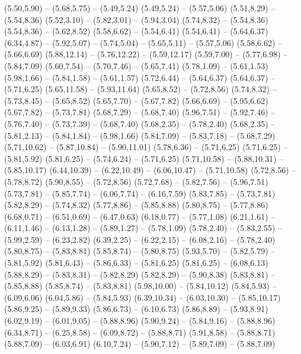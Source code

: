 {  (5.50,5.90) -- (5.68,5.75) -- (5.49,5.24)
  (5.49,5.24) -- (5.57,5.06)
  (5.51,8.29) -- (5.54,8.36)
  (5.52,3.10) -- (5.82,3.01) -- (5.94,3.04)
  (5.74,8.32) -- (5.54,8.36)
  (5.54,8.36) -- (5.62,8.52)
  (5.58,6.62) -- (5.54,6.41)
  (5.54,6.41) -- (5.64,6.37)
  (6.34,4.87) -- (5.92,5.07) -- (5.74,5.04) -- (5.65,5.11) -- (5.57,5.06)
  (5.58,6.62) -- (5.66,6.69)
  (5.88,12.14) -- (5.76,12.22) -- (5.59,12.17)
  (5.59,7.00) -- (5.77,6.98) -- (5.84,7.09)
  (5.60,7.54) -- (5.70,7.46) -- (5.65,7.41)
  (5.78,1.09) -- (5.61,1.53)
  (5.98,1.66) -- (5.84,1.58) -- (5.61,1.57)
  (5.72,6.44) -- (5.64,6.37)
  (5.64,6.37) -- (5.71,6.25)
  (5.65,11.58) -- (5.93,11.64)
  (5.65,8.52) -- (5.72,8.56)
  (5.74,8.32) -- (5.73,8.45) -- (5.65,8.52)
  (5.65,7.70) -- (5.67,7.82)
  (5.66,6.69) -- (5.95,6.62)
  (5.67,7.82) -- (5.73,7.81)
  (5.68,7.29) -- (5.68,7.40)
  (5.96,7.51) -- (5.92,7.46) -- (5.76,7.40) -- (5.73,7.39) -- (5.68,7.40)
  (5.68,2.35) -- (5.78,2.40)
  (5.68,2.35) -- (5.81,2.13) -- (5.84,1.84) -- (5.98,1.66)
  (5.84,7.09) -- (5.83,7.18) -- (5.68,7.29)
  (5.71,10.62) -- (5.87,10.84) -- (5.90,11.01)
  (5.78,6.36) -- (5.71,6.25)
  (5.71,6.25) -- (5.81,5.92)
  (5.81,6.25) -- (5.74,6.24) -- (5.71,6.25)
  (5.71,10.58) -- (5.88,10.31) -- (5.85,10.17)
  (6.44,10.39) -- (6.22,10.49) -- (6.06,10.47) -- (5.71,10.58)
  (5.72,8.56) -- (5.78,8.72)
  (5.90,8.55) -- (5.72,8.56)
  (5.72,7.68) -- (5.82,7.56) -- (5.96,7.51)
  (5.73,7.81) -- (5.85,7.74) -- (6.06,7.74) -- (6.16,7.59)
  (5.83,7.85) -- (5.73,7.81)
  (5.82,8.29) -- (5.74,8.32)
  (5.77,8.86) -- (5.85,8.88)
  (5.80,8.75) -- (5.77,8.86)
  (6.68,0.71) -- (6.51,0.69) -- (6.47,0.63)
  (6.18,0.77) -- (5.77,1.08)
  (6.21,1.61) -- (6.11,1.46) -- (6.13,1.28) -- (5.89,1.27) -- (5.78,1.09)
  (5.78,2.40) -- (5.83,2.55) -- (5.99,2.59) -- (6.23,2.82)
  (6.39,2.25) -- (6.22,2.15) -- (6.08,2.16) -- (5.78,2.40)
  (5.80,8.75) -- (5.83,8.81)
  (5.85,8.74) -- (5.80,8.75)
  (5.93,5.70) -- (5.82,5.79) -- (5.81,5.92)
  (5.81,6.43) -- (5.86,6.33) -- (5.81,6.25)
  (5.81,6.25) -- (6.08,6.13)
  (5.88,8.29) -- (5.83,8.31) -- (5.82,8.29)
  (5.82,8.29) -- (5.90,8.38)
  (5.83,8.81) -- (5.85,8.88)
  (5.85,8.74) -- (5.83,8.81)
  (5.98,10.00) -- (5.84,10.12)
  (5.84,5.93) -- (6.09,6.06)
  (6.04,5.86) -- (5.84,5.93)
  (6.39,10.34) -- (6.03,10.30) -- (5.85,10.17)
  (5.86,9.25) -- (5.89,9.33)
  (5.86,6.73) -- (6.10,6.73)
  (5.86,8.89) -- (5.93,8.91)
  (6.02,9.19) -- (6.01,9.05) -- (5.88,8.96)
  (5.90,9.24) -- (5.84,9.16) -- (5.88,8.96)
  (6.34,8.71) -- (6.25,8.58) -- (6.09,8.72) -- (5.88,8.71)
  (5.91,8.58) -- (5.88,8.71)
  (5.88,7.09) -- (6.03,6.91)
  (6.10,7.24) -- (5.90,7.12) -- (5.89,7.09) -- (5.88,7.09)
}
